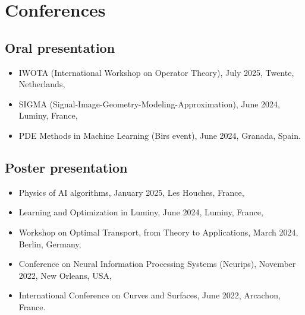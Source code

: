 \documentclass[11pt,a4paper,sans]{moderncv}
\begin{document}
\section{Conferences}

\subsection{Oral presentation}

\begin{itemize}
	\item IWOTA (International Workshop on Operator Theory), July 2025, Twente, Netherlands,
	\item SIGMA (Signal-Image-Geometry-Modeling-Approximation), June 2024, Luminy, France,
	\item PDE Methods in Machine Learning (Birs event), June 2024, Granada, Spain.
\end{itemize}

\subsection{Poster presentation}

\begin{itemize}
	\item Physics of AI algorithms, January 2025, Les Houches, France,
	\item Learning and Optimization in Luminy, June 2024, Luminy, France,
	\item Workshop on  Optimal Transport, from Theory to Applications, March 2024, Berlin, Germany,
	\item Conference on Neural Information Processing Systems (Neurips), November 2022, New Orleans, USA,
	\item International Conference on Curves and Surfaces, June 2022, Arcachon, France.
\end{itemize}
\end{document}
